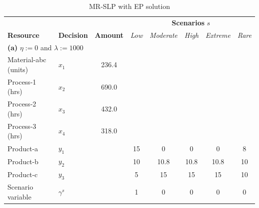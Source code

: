 \documentclass[7pt]{article}
\begin{document}
\begin{table}[h!]
    \centering
    \footnotesize
    \caption{\small{MR-SLP with EP solution}}
    \begin{tabular}{ll|c|ccccc}
        \toprule
        \multicolumn{3}{l|}{} & \multicolumn{5}{c}{\textbf{Scenarios }$s$}                                                                                                         \\
        \textbf{Resource}     & \textbf{Decision}                          & \textbf{Amount} & \textit{Low} & \textit{Moderate} & \textit{High} & \textit{Extreme} & \textit{Rare} \\
        \midrule
        \multicolumn{8}{l}{\textbf{(a)} $\eta := 0$ and $\lambda := 1000$}                                                                                                         \\
        \midrule
        Material-abc (units)  & $x_1$                                      & 236.4           &              &                   &               &                                  \\
        Process-1 (hrs)       & $x_2$                                      & 690.0           &              &                   &               &                                  \\
        Process-2 (hrs)       & $x_3$                                      & 432.0           &              &                   &               &                                  \\
        Process-3 (hrs)       & $x_4$                                      & 318.0           &              &                   &               &                                  \\
        Product-a             & $y_1$                                      &                 & 15           & 0                 & 0             & 0                & 8             \\
        Product-b             & $y_2$                                      &                 & 10           & 10.8              & 10.8          & 10.8             & 10            \\
        Product-c             & $y_3$                                      &                 & 5            & 15                & 15            & 15               & 10            \\
        Scenario variable     & $\gamma^s$                                 &                 & 1            & 0                 & 0             & 0                & 0             \\

\end{tabular}
\end{table}
\end{document}
